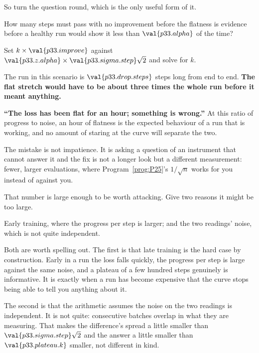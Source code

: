 \begin{fr}
So turn the question round, which is the only useful form of it.

How many steps must pass with no improvement before the flatness is evidence
\dash{} before a healthy run would show it less than
$\val{p33.alpha}$ of the time?
\dotline
\nextframe
\end{fr}

\begin{fr}
\begin{ansblock}
Set $k \times \val{p33.improve}$ against
$\val{p33.z.alpha} \times \val{p33.sigma.step}\sqrt{2}$ and solve for $k$.
\end{ansblock}

The run in this scenario is $\val{p33.drop.steps}$ steps long from end to
end. \textbf{The flat stretch would have to be about three times the whole
run before it meant anything.}
\end{fr}


\begin{fr}
\begin{trapbox}
\textbf{\enquote{The loss has been flat for an hour; something is wrong.}}
At this ratio of progress to noise, an hour of flatness is the expected
behaviour of a run that is working, and no amount of staring at the curve
will separate the two.

The mistake is not impatience. It is asking a question of an instrument that
cannot answer it \dash{} and the fix is not a longer look but a different
measurement: fewer, larger evaluations, where Program~\ref{prog:P25}'s
$1/\sqrt{n}$ works for you instead of against you.
\end{trapbox}

That number is large enough to be worth attacking. Give two reasons it might
be too large.
\dotline
\nextframe
\end{fr}

\begin{fr}
\begin{ansblock}
Early training, where the progress per step is larger; and the two readings'
noise, which is not quite independent.
\end{ansblock}

Both are worth spelling out. The first is that late training is the hard case by construction. Early in a
run the loss falls quickly, the progress per step is large against the same
noise, and a plateau of a few hundred steps genuinely is informative. It is
exactly when a run has become expensive that the curve stops being able to
tell you anything about it.

The second is that the arithmetic assumes the noise on the two readings is
independent. It is not quite: consecutive batches overlap in what they are
measuring. That makes the difference's spread a little smaller than
$\val{p33.sigma.step}\sqrt{2}$ and the answer a little smaller than
$\val{p33.plateau.k}$ \dash{} smaller, not different in kind.
\end{fr}

